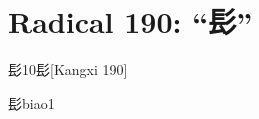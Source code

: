 
\section*{Radical 190: ``⾽''}

\begin{Entry}{髟}{10}{⾽}[Kangxi 190]
  \begin{Phonetics}{髟}{biao1}
  \end{Phonetics}
\end{Entry}


